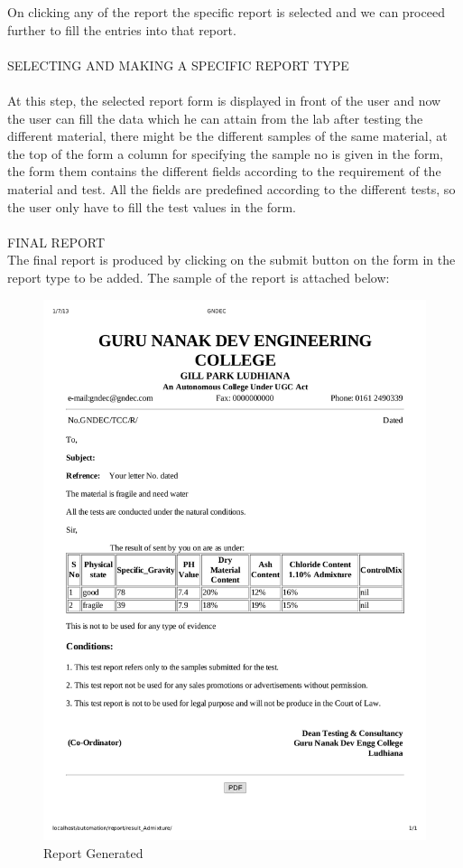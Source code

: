On clicking any of the report the specific report is selected and we can proceed further to fill the entries into that report.\\\\
SELECTING AND MAKING A SPECIFIC REPORT TYPE\\\\
At this step, the selected report form is displayed in front of the user and now the user can fill the data which he can attain from the lab after testing the different material, there might be the different samples of the same material, at the top of the form a column for specifying the sample no is given in the form, the form them contains the different fields according to the requirement of the material and test. All the fields are predefined according to the different tests, so the user only have to fill the test values in the form.\\\\
FINAL REPORT\\
The final report is produced by clicking on the submit button on the form in the report type to be added. The sample of the report is attached below: 
\newpage
\begin{figure}[h]
\centering \includegraphics[scale=0.5]{GNDEC.png}
\caption{Report Generated}
\end{figure}





